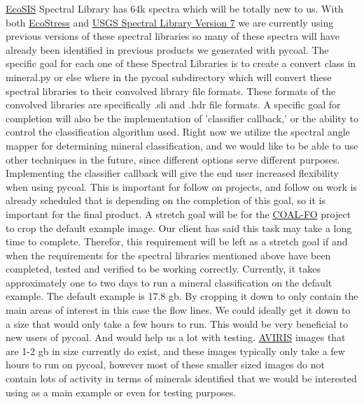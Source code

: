 \documentclass[a4paper,12pt]{article}
\begin{document}
\href{https://ecosis.org/}{EcoSIS} Spectral Library has 64k spectra which will be totally new to us. With both \href{https://speclib.jpl.nasa.gov/}{EcoStress} and \href{https://crustal.usgs.gov/speclab/QueryAll07a.php}{USGS Spectral Library Version 7} we are currently using previous versions of these spectral libraries so many of these spectra will have already been identified in previous products we generated with pycoal. \newline
\newline
The specific goal for each one of these Spectral Libraries is to create a convert class in mineral.py or else where in the pycoal subdirectory which will convert these spectral libraries to their convolved library file formats. These formats of the convolved libraries are specifically .sli and .hdr file formats.\newline
\newline
A specific goal for completion will also be the implementation of 'classifier callback,' or the ability to control the classification algorithm used. Right now we utilize the spectral angle mapper for determining mineral classification, and we would like to be able to use other techniques in the future, since different options serve different purposes. Implementing the classifier callback will give the end user increased flexibility when using pycoal. This is important for follow on projects, and follow on work is already scheduled that is depending on the completion of this goal, so it is important for the final product. 
\newline
A stretch goal will be for the \href{https://capstone-coal.github.io/team}{COAL-FO} project to crop the default example image. Our client has said this task may take a long time to complete. Therefor, this requirement will be left as a stretch goal if and when the requirements for the spectral libraries mentioned above have been completed, tested and verified to be working correctly. \newline
\newline
Currently, it takes approximately one to two days to run a mineral classification on the default example. The default example is 17.8 gb. By cropping it down to only contain the main areas of interest in this case the flow lines. We could ideally get it down to a size that would only take a few hours to run. This would be very beneficial to new users of pycoal. And would help us a lot with testing. \href{https://aviris.jpl.nasa.gov/}{AVIRIS} images that are 1-2 gb in size currently do exist, and these images typically only take a few hours to run on pycoal, however most of these smaller sized images do not contain lots of activity in terms of minerals identified that we would be interested using as a main example or even for testing purposes. \newline
\end{document}
